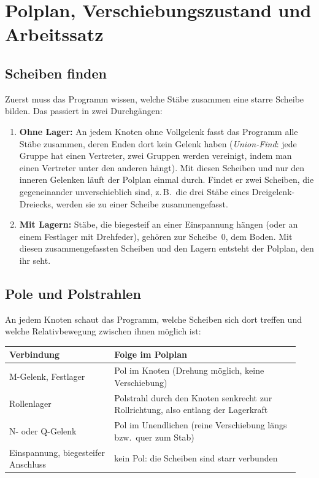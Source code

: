 \section{Polplan, Verschiebungszustand und Arbeitssatz}\label{sec:mathe-polplan}

\subsection{Scheiben finden}

Zuerst muss das Programm wissen, welche Stäbe zusammen eine starre Scheibe bilden. Das passiert
in zwei Durchgängen:

\begin{enumerate}
  \item \textbf{Ohne Lager:} An jedem Knoten ohne Vollgelenk fasst das Programm alle Stäbe
        zusammen, deren Enden dort kein Gelenk haben (\emph{Union-Find}: jede Gruppe hat einen
        Vertreter, zwei Gruppen werden vereinigt, indem man einen Vertreter unter den anderen
        hängt). Mit diesen Scheiben und nur den inneren Gelenken läuft der Polplan einmal durch.
        Findet er zwei Scheiben, die gegeneinander unverschieblich sind, z.\,B.\ die drei Stäbe
        eines Dreigelenk-Dreiecks, werden sie zu einer Scheibe zusammengefasst.
  \item \textbf{Mit Lagern:} Stäbe, die biegesteif an einer Einspannung hängen (oder an einem
        Festlager mit Drehfeder), gehören zur Scheibe~0, dem Boden. Mit diesen zusammengefassten
        Scheiben und den Lagern entsteht der Polplan, den ihr seht.
\end{enumerate}

\subsection{Pole und Polstrahlen}

An jedem Knoten schaut das Programm, welche Scheiben sich dort treffen und welche Relativbewegung
zwischen ihnen möglich ist:

\begin{longtable}{p{0.34\linewidth}p{0.60\linewidth}}
  \toprule
  \textbf{Verbindung} & \textbf{Folge im Polplan} \\
  \midrule \endhead
  M-Gelenk, Festlager & Pol im Knoten (Drehung möglich, keine Verschiebung) \\
  Rollenlager & Polstrahl durch den Knoten senkrecht zur Rollrichtung, also entlang der
    Lagerkraft \\
  N- oder Q-Gelenk & Pol im Unendlichen (reine Verschiebung längs bzw.\ quer zum Stab) \\
  Einspannung, biegesteifer Anschluss & kein Pol: die Scheiben sind starr verbunden \\
  \bottomrule
\end{longtable}

